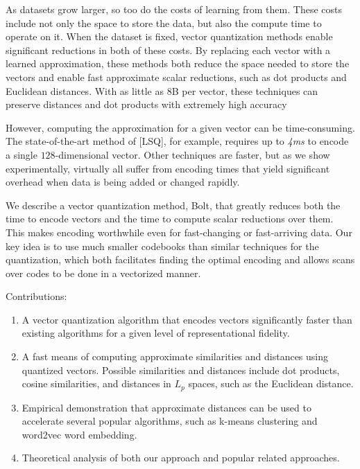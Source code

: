 

As datasets grow larger, so too do the costs of learning from them. These costs include not only the space to store the data, but also the compute time to operate on it. When the dataset is fixed, vector quantization methods enable significant reductions in both of these costs. By replacing each vector with a learned approximation, these methods both reduce the space needed to store the vectors and enable fast approximate scalar reductions, such as dot products and Euclidean distances. With as little as 8B per vector, these techniques can preserve distances and dot products with extremely high accuracy %

However, computing the approximation for a given vector can be time-consuming. The state-of-the-art method of [LSQ], for example, requires up to \textit{4ms} to encode a single $128$-dimensional vector. Other techniques are faster, but as we show experimentally, virtually all suffer from encoding times that yield significant overhead when data is being added or changed rapidly.

We describe a vector quantization method, Bolt, that greatly reduces both the time to encode vectors and the time to compute scalar reductions over them. This makes encoding worthwhile even for fast-changing or fast-arriving data. Our key idea is to use much smaller codebooks than similar techniques for the quantization, which both facilitates finding the optimal encoding and allows scans over codes to be done in a vectorized manner.

Contributions:
\begin{enumerate}
\item A vector quantization algorithm that encodes vectors significantly faster than existing algorithms for a given level of representational fidelity.
\item A fast means of computing approximate similarities and distances using quantized vectors. Possible similarities and distances include dot products, cosine similarities, and distances in $L_p$ spaces, such as the Euclidean distance.
\item Empirical demonstration that approximate distances can be used to accelerate several popular algorithms, such as k-means clustering and word2vec word embedding.
\item Theoretical analysis of both our approach and popular related approaches.
\end{enumerate}


